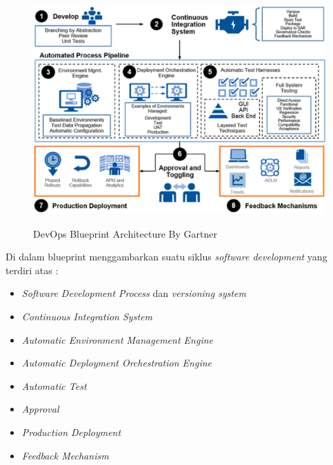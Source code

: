 \documentclass[9pt,twocolumn,twoside]{Gunadarma}
\begin{document}
\begin{figure}[htbp]
	\begin{center}
		\includegraphics[width=1\columnwidth]{DevOps.eps} \label{fig:1-noFCase1}
	\end{center}
	\caption{DevOps Blueprint Architecture By Gartner}
\end{figure}
    
Di dalam blueprint menggambarkan suatu siklus \textit{software development} yang terdiri atas :
\begin{itemize}
	\item \textit{Software Development Process} dan \textit{versioning system}
	\item \textit{Continuous Integration System}
	\item \textit{Automatic Environment Management Engine}
	\item \textit{Automatic Deployment Orchestration Engine}
	\item \textit{Automatic Test}
	\item \textit{Approval}
	\item \textit{Production Deployment}
	\item \textit{Feedback Mechanism}
\end{itemize}
\end{document}
